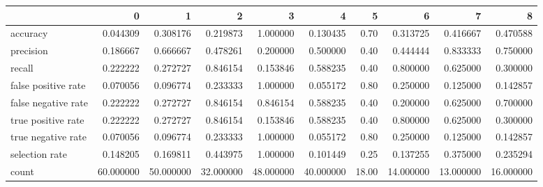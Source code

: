\begin{tabular}{lrrrrrrrrr}
\toprule
{} &          0 &          1 &          2 &          3 &          4 &      5 &          6 &          7 &          8 \\
\midrule
accuracy            &   0.044309 &   0.308176 &   0.219873 &   1.000000 &   0.130435 &   0.70 &   0.313725 &   0.416667 &   0.470588 \\
precision           &   0.186667 &   0.666667 &   0.478261 &   0.200000 &   0.500000 &   0.40 &   0.444444 &   0.833333 &   0.750000 \\
recall              &   0.222222 &   0.272727 &   0.846154 &   0.153846 &   0.588235 &   0.40 &   0.800000 &   0.625000 &   0.300000 \\
false positive rate &   0.070056 &   0.096774 &   0.233333 &   1.000000 &   0.055172 &   0.80 &   0.250000 &   0.125000 &   0.142857 \\
false negative rate &   0.222222 &   0.272727 &   0.846154 &   0.846154 &   0.588235 &   0.40 &   0.200000 &   0.625000 &   0.700000 \\
true positive rate  &   0.222222 &   0.272727 &   0.846154 &   0.153846 &   0.588235 &   0.40 &   0.800000 &   0.625000 &   0.300000 \\
true negative rate  &   0.070056 &   0.096774 &   0.233333 &   1.000000 &   0.055172 &   0.80 &   0.250000 &   0.125000 &   0.142857 \\
selection rate      &   0.148205 &   0.169811 &   0.443975 &   1.000000 &   0.101449 &   0.25 &   0.137255 &   0.375000 &   0.235294 \\
count               &  60.000000 &  50.000000 &  32.000000 &  48.000000 &  40.000000 &  18.00 &  14.000000 &  13.000000 &  16.000000 \\
\bottomrule
\end{tabular}
